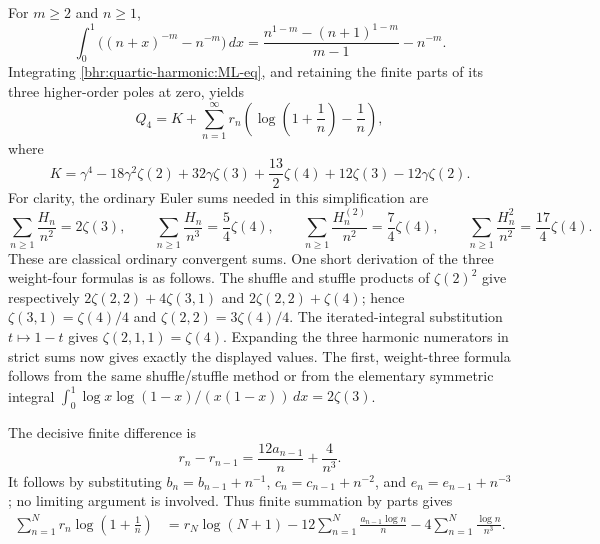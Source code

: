\documentclass[11pt]{article}
\numberwithin{equation}{section}
\theoremstyle{plain}
\theoremstyle{definition}
\theoremstyle{remark}
\begin{document}
For $m\ge2$ and $n\ge1$,
\[
 \int_0^1\bigl((n+x)^{-m}-n^{-m}\bigr)\,dx
     =\frac{n^{1-m}-(n+1)^{1-m}}{m-1}-n^{-m}.
\]
Integrating \eqref{bhr:quartic-harmonic:ML-eq}, and retaining the finite
parts of its three higher-order poles at zero, yields
\begin{equation}
 Q_4=K+\sum_{n=1}^{\infty}r_n
      \left(\log\left(1+\frac1n\right)-\frac1n\right),
      \label{bhr:quartic-harmonic:K-eq}
\end{equation}
where
\begin{equation}
 K=\gamma^4-18\gamma^2\zeta(2)+32\gamma\zeta(3)
       +\frac{13}{2}\zeta(4)+12\zeta(3)-12\gamma\zeta(2).
       \label{bhr:quartic-harmonic:K}
\end{equation}
For clarity, the ordinary Euler sums needed in this simplification are
\begin{equation}
 \sum_{n\ge1}\frac{H_n}{n^2}=2\zeta(3),\qquad
 \sum_{n\ge1}\frac{H_n}{n^3}=\frac54\zeta(4),\qquad
 \sum_{n\ge1}\frac{H_n^{(2)}}{n^2}=\frac74\zeta(4),\qquad
 \sum_{n\ge1}\frac{H_n^2}{n^2}=\frac{17}4\zeta(4).
 \label{bhr:quartic-harmonic:euler}
\end{equation}
These are classical ordinary convergent sums. One short derivation of
the three weight-four formulas is as follows. The shuffle and stuffle
products of $\zeta(2)^2$ give respectively
$2\zeta(2,2)+4\zeta(3,1)$ and $2\zeta(2,2)+\zeta(4)$;
hence $\zeta(3,1)=\zeta(4)/4$ and
$\zeta(2,2)=3\zeta(4)/4$.
The iterated-integral substitution $t\mapsto1-t$ gives
$\zeta(2,1,1)=\zeta(4)$. Expanding the three harmonic numerators
in strict sums now gives exactly the displayed values. The first,
weight-three formula follows from the same shuffle/stuffle method or
from the elementary symmetric integral
$\int_0^1\log x\log(1-x)/(x(1-x))\,dx=2\zeta(3)$.

The decisive finite difference is
\begin{equation}
 r_n-r_{n-1}=\frac{12a_{n-1}}n+\frac4{n^3}.
 \label{bhr:quartic-harmonic:residue-difference}
\end{equation}
It follows by substituting
$b_n=b_{n-1}+n^{-1}$, $c_n=c_{n-1}+n^{-2}$,
and $e_n=e_{n-1}+n^{-3}$; no limiting argument is involved.
Thus finite summation by parts gives
\begin{align}
 \sum_{n=1}^N r_n\log\left(1+\frac1n\right)
 &=r_N\log(N+1)-12\sum_{n=1}^N\frac{a_{n-1}\log n}{n}
                      -4\sum_{n=1}^N\frac{\log n}{n^3}.
 \label{bhr:quartic-harmonic:SBP}
\end{align}
\end{document}
